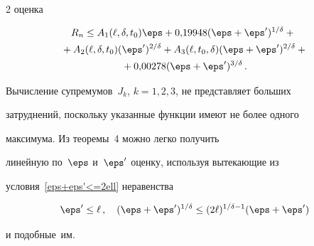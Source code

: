 \begin{multicols}{2}
{оценка}


\begin{multline*}


\!R_n\le A_1(\ell,\delta,t_0)\eps+ 0{,}19948(\eps+\eps')^{1/\delta}+{}\\


{}+A_2(\ell,\delta,t_0)(\eps')^{2/\delta}+


A_3(\ell,t_0,\delta)(\eps+\eps')^{2/\delta}+{}\\


{}+ 0{,}00278(\eps+\eps')^{3/\delta}\,.


\end{multline*}





\smallskip





Вычисление супремумов~$J_k$, $k=1, 2, 3$, не представляет больших


затруднений, поскольку указанные функции имеют не более одного


максимума. Из теоремы~4 можно легко получить


линейную по~$\eps$ и~$\eps'$ оценку, используя вытекающие из


условия~\eqref{eps+eps'<=2ell} неравенства


$$


\eps'\le\ell\,,\quad


(\eps+\eps')^{1/\delta}\le(2\ell)^{1/\delta-1}(\eps+\eps')


$$


и подобные~им.





\setcounter{table}{8}


\begin{table}[b]\small


\vspace*{-12pt}


\begin{center}


\parbox{150mm}{





}






\end{center}
\end{table}
\end{multicols}
